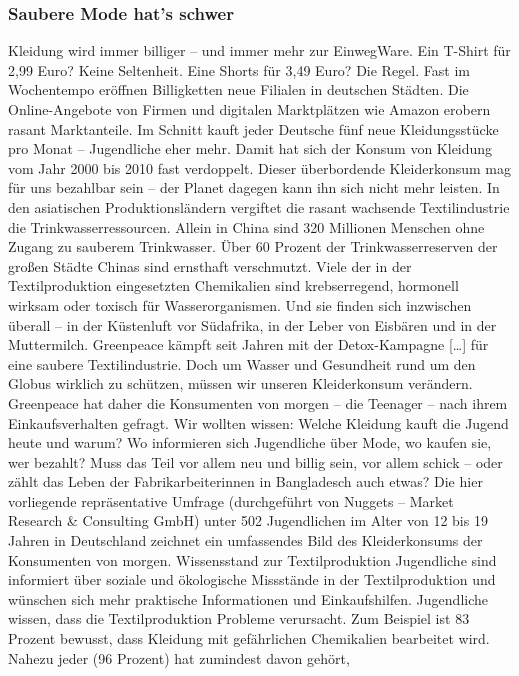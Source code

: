 \subsubsection{Saubere Mode hat's schwer}
Kleidung wird immer billiger –
und immer mehr zur EinwegWare. Ein T-Shirt für 2,99 Euro?
Keine Seltenheit. Eine Shorts für
3,49  Euro? Die Regel. Fast im
Wochentempo eröffnen Billigketten neue Filialen in deutschen
Städten. Die Online-Angebote
von Firmen und digitalen Marktplätzen wie Amazon erobern
rasant Marktanteile. Im Schnitt
kauft jeder Deutsche fünf neue
Kleidungsstücke pro Monat –
Jugendliche eher mehr. Damit
hat sich der Konsum von Kleidung vom Jahr 2000 bis 2010 fast
verdoppelt.
Dieser überbordende Kleiderkonsum mag für uns bezahlbar sein –
der Planet dagegen kann ihn sich
nicht mehr leisten. In den asiatischen Produktionsländern vergiftet die rasant wachsende Textilindustrie die Trinkwasserressourcen.
Allein in China sind 320  Millionen Menschen ohne Zugang
zu sauberem Trinkwasser. Über
60 Prozent der Trinkwasserreserven der großen Städte Chinas sind
ernsthaft verschmutzt. Viele der in
der Textilproduktion eingesetzten
Chemikalien sind krebserregend,
hormonell wirksam oder toxisch
für Wasserorganismen. Und sie
finden sich inzwischen überall –
in der Küstenluft vor Südafrika, in
der Leber von Eisbären und in der
Muttermilch. Greenpeace kämpft
seit Jahren mit der Detox-Kampagne […] für eine saubere Textilindustrie. Doch um Wasser und
Gesundheit rund um den Globus
wirklich zu schützen, müssen wir
unseren Kleiderkonsum verändern. Greenpeace hat daher die
Konsumenten von morgen – die
Teenager – nach ihrem Einkaufsverhalten gefragt. Wir wollten
wissen: Welche Kleidung kauft
die Jugend heute und warum?
Wo informieren sich Jugendliche
über Mode, wo kaufen sie, wer
bezahlt? Muss das Teil vor allem
neu und billig sein, vor allem
schick – oder zählt das Leben der
Fabrikarbeiterinnen in Bangladesch auch etwas? Die hier vorliegende repräsentative Umfrage
(durchgeführt von Nuggets –
Market Research  \& Consulting
GmbH) unter 502  Jugendlichen
im Alter von 12 bis 19 Jahren in
Deutschland zeichnet ein umfassendes Bild des Kleiderkonsums
der Konsumenten von morgen.
Wissensstand zur Textilproduktion
Jugendliche sind informiert über
soziale und ökologische Missstände in der Textilproduktion
und wünschen sich mehr praktische Informationen und Einkaufshilfen.
Jugendliche wissen, dass die Textilproduktion Probleme verursacht.
Zum Beispiel ist 83  Prozent
bewusst, dass Kleidung mit
gefährlichen Chemikalien bearbeitet wird. Nahezu jeder (96 Prozent) hat zumindest davon gehört,
